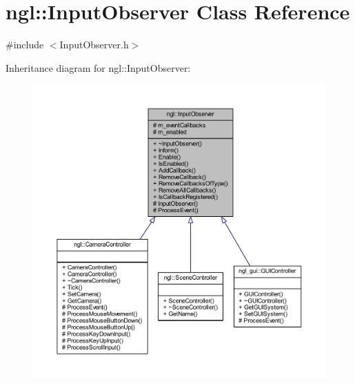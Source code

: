 \hypertarget{classngl_1_1_input_observer}{}\section{ngl\+:\+:Input\+Observer Class Reference}
\label{classngl_1_1_input_observer}


{\ttfamily \#include $<$Input\+Observer.\+h$>$}



Inheritance diagram for ngl\+:\+:Input\+Observer\+:
\nopagebreak
\begin{figure}[H]
\begin{center}
\leavevmode
\includegraphics[width=350pt]{classngl_1_1_input_observer__inherit__graph}
\end{center}
\end{figure}


